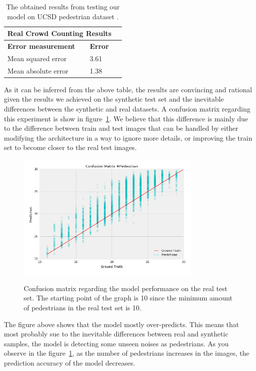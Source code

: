 \begin{table}[H]
\centering
\small\sffamily
\begin{tabular}{llr}
\multicolumn{2}{c}{\textbf{\textbf{Real Crowd Counting Results}}} \\
\bottomrule
\textbf{Error measurement}        & \textbf{Error} \\
\bottomrule
Mean squared error       & 3.61  \\
Mean absolute error      & 1.38  \\
\bottomrule
\end{tabular}
\caption{The obtained results from testing our model on UCSD pedestrian dataset \cite{chan2008privacy}. }
\label{tab:ucsdreal}
\end{table} 

As it can be inferred from the above table, the results are convincing and rational given the results we achieved on the synthetic test set and the inevitable differences between the synthetic and real datasets. A confusion matrix regarding this experiment is show in figure~\ref{confnew}. We believe that this difference is mainly due to the difference between train and test images that can be handled by either modifying the architecture in a way to ignore more details, or improving the train set to become closer to the real test images. 

\begin{figure}[H]
	\centering
	{\includegraphics[width=0.8\textwidth]{images/realtestfig}}
	\caption{Confusion matrix regarding the model performance on the real test set. The starting point of the graph is 10 since the minimum amount of pedestrians in the real test set is 10.}
	\label{confnew}
\end{figure}
The figure above shows that the model mostly over-predicts. This means that most probably sue to the inevitable differences between real and synthetic samples, the model is detecting some unseen noises as pedestrians. As you observe in the figure~\ref{confnew}, as the number of pedestrians increases in the images, the prediction accuracy of the model decreases.  


